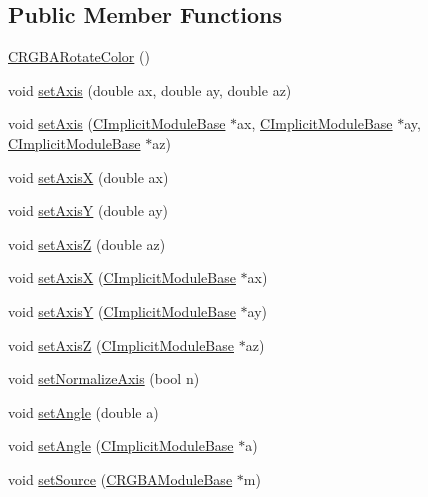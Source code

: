 \subsection*{Public Member Functions}
\begin{DoxyCompactItemize}
\item 
\hyperlink{classanl_1_1CRGBARotateColor_a7ba7803c4753991a9d5ce7340e293ec7}{CRGBARotateColor} ()
\item 
void \hyperlink{classanl_1_1CRGBARotateColor_a148eb4893227f4d831e792eb46777c23}{setAxis} (double ax, double ay, double az)
\item 
void \hyperlink{classanl_1_1CRGBARotateColor_a9d129d41d67afc21ff1e426eeb5a6987}{setAxis} (\hyperlink{classanl_1_1CImplicitModuleBase}{CImplicitModuleBase} $\ast$ax, \hyperlink{classanl_1_1CImplicitModuleBase}{CImplicitModuleBase} $\ast$ay, \hyperlink{classanl_1_1CImplicitModuleBase}{CImplicitModuleBase} $\ast$az)
\item 
void \hyperlink{classanl_1_1CRGBARotateColor_a69d6eef8731b113e1722c2c104f407e0}{setAxisX} (double ax)
\item 
void \hyperlink{classanl_1_1CRGBARotateColor_a43a568c40902d750d8acbe7e54a77c99}{setAxisY} (double ay)
\item 
void \hyperlink{classanl_1_1CRGBARotateColor_a71bfd35d567570db66260cf687bc4fb0}{setAxisZ} (double az)
\item 
void \hyperlink{classanl_1_1CRGBARotateColor_a95761cf5c645d05e3351a0e71a215dbb}{setAxisX} (\hyperlink{classanl_1_1CImplicitModuleBase}{CImplicitModuleBase} $\ast$ax)
\item 
void \hyperlink{classanl_1_1CRGBARotateColor_a1bd35b5e08daec00b5738f5edf7858c5}{setAxisY} (\hyperlink{classanl_1_1CImplicitModuleBase}{CImplicitModuleBase} $\ast$ay)
\item 
void \hyperlink{classanl_1_1CRGBARotateColor_abcfdbcacc808c942fa5f914ac2e4ae5c}{setAxisZ} (\hyperlink{classanl_1_1CImplicitModuleBase}{CImplicitModuleBase} $\ast$az)
\item 
void \hyperlink{classanl_1_1CRGBARotateColor_afa426f331d8184e9b2c6d7bdd977bec0}{setNormalizeAxis} (bool n)
\item 
void \hyperlink{classanl_1_1CRGBARotateColor_ac3338cc2827f77b17a286effcb2cba8d}{setAngle} (double a)
\item 
void \hyperlink{classanl_1_1CRGBARotateColor_a3dc2409b024ee22e1e8e9c71b24200ba}{setAngle} (\hyperlink{classanl_1_1CImplicitModuleBase}{CImplicitModuleBase} $\ast$a)
\item 
void \hyperlink{classanl_1_1CRGBARotateColor_abc4aa1c2d4878186e49abc5b6fa9c987}{setSource} (\hyperlink{classanl_1_1CRGBAModuleBase}{CRGBAModuleBase} $\ast$m)

\end{DoxyCompactItemize}
